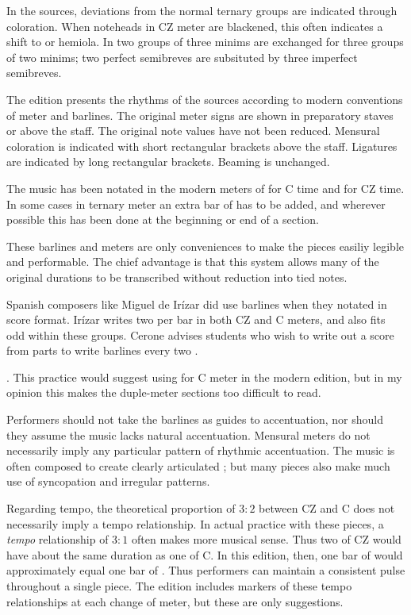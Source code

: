 In the sources, deviations from the normal ternary groups are indicated through coloration. 
When noteheads in CZ meter are blackened, this often indicates a shift to  or hemiola.
In  two groups of three minims are exchanged for three groups of two minims; two perfect semibreves are subsituted by three imperfect semibreves.

The edition presents the rhythms of the sources according to modern conventions of meter and barlines.
The original meter signs are shown in preparatory staves or above the staff.
The original note values have not been reduced.
Mensural coloration is indicated with short rectangular brackets above the staff.
Ligatures are indicated by long rectangular brackets.
Beaming is unchanged.

The music has been notated in the modern meters of  for C time and  for CZ time.
In some cases in ternary meter an extra bar of  has to be added, and wherever possible this has been done at the beginning or end of a section.

These barlines and meters are only conveniences to make the pieces easiliy legible and performable.
The chief advantage is that this system allows many of the original durations to be transcribed without reduction into tied notes.

Spanish composers like Miguel de Irízar did use barlines when they notated in score format.
Irízar writes two  per bar in both CZ and C meters, and also fits odd  within these groups.
Cerone advises students who wish to write out a score from parts to write barlines every two .%
  \begin{Footnote}
  \autocite[745]{Cerone:Melopeo}.
  This practice would suggest using  for C meter in the modern edition, but in my opinion this makes the duple-meter sections too difficult to read.
  \end{Footnote}

Performers should not take the barlines as guides to accentuation, nor should they assume the music lacks natural accentuation.
Mensural meters do not necessarily imply any particular pattern of rhythmic accentuation.
The music is often composed to create clearly articulated ; but many pieces also make much use of syncopation and irregular patterns.

Regarding tempo, the theoretical proportion of $3:2$ between CZ and C does not necessarily imply a tempo relationship.
In actual practice with these pieces, a \emph{tempo} relationship of $3:1$ often makes more musical sense.
Thus two  of CZ would have about the same duration as one  of C.
In this edition, then, one bar of  would approximately equal one bar of .
Thus performers can maintain a consistent pulse throughout a single piece.
The edition includes markers of these tempo relationships at each change of meter, but these are only suggestions.

